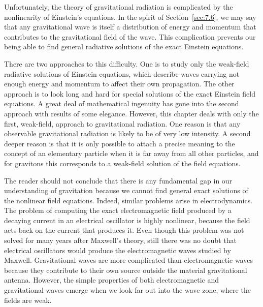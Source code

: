Unfortunately, the theory of gravitational radiation is complicated by the
nonlinearity of Einstein's equations. In the spirit of Section~\ref{sec:7.6},
we may say that any gravitational wave is itself a distribution of energy and
momentum that contributes to the gravitational field of the wave. This
complication prevents our being able to find general radiative solutions of
the exact Einstein equations.

There are two approaches to this difficulty. One is to study only the
weak-field radiative solutions of Einstein equations, which describe waves
carrying not enough energy and momentum to affect their own propagation. The
other approach is to look long and hard for special solutions of the exact
Einstein field equations. A great deal of mathematical ingenuity has gone
into the second approach with results of some elegance. However, this chapter
deals with only the first, weak-field, approach to gravitational radiation.
One reason is that any observable gravitational radiation is likely to be of
very low intensity. A second deeper reason is that it is only possible to
attach a precise meaning to the concept of an elementary particle when it is
far away from all other particles, and for gravitons this corresponds to a
weak-field solution of the field equations.

The reader should not conclude that there is any fundamental gap in our
understanding of gravitation because we cannot find general exact solutions of
the nonlinear field equations. Indeed, similar problems arise in
electrodynamics. The problem of computing the exact electromagnetic field
produced by a decaying current in an electrical oscillator is highly
nonlinear, because the field acts back on the current that produces it. Even
though this problem was not solved for many years after Maxwell's theory,
still there was no doubt that electrical oscillators would produce the
electromagnetic waves studied by Maxwell. Gravitational waves are more
complicated than electromagnetic waves because they contribute to their own
source outside the material gravitational antenna. However, the simple
properties of both electromagnetic and gravitational waves emerge when we
look far out into the wave zone, where the fields are weak.
